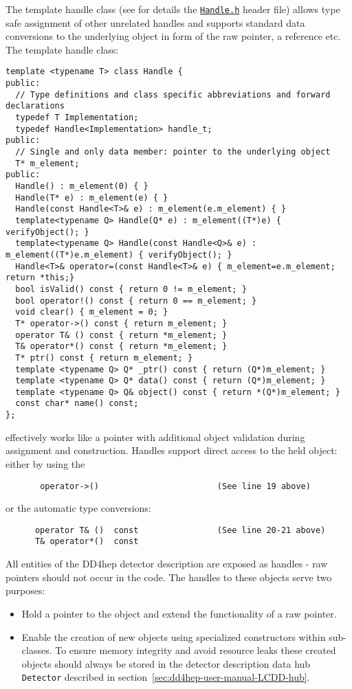 The template handle class (see for details the \href{https://dd4hep.web.cern.ch/dd4hep/reference/classdd4hep_1_1Handle.html}{\texttt{Handle.h}} header file) allows type safe assignment of other unrelated handles and supports standard data conversions to the underlying object in form of the raw pointer, a reference etc.
The template handle class:

\begin{verbatim}
template <typename T> class Handle {
public:
  // Type definitions and class specific abbreviations and forward declarations
  typedef T Implementation;
  typedef Handle<Implementation> handle_t;
public:
  // Single and only data member: pointer to the underlying object
  T* m_element;
public:
  Handle() : m_element(0) { }
  Handle(T* e) : m_element(e) { }
  Handle(const Handle<T>& e) : m_element(e.m_element) { }
  template<typename Q> Handle(Q* e) : m_element((T*)e) { verifyObject(); }
  template<typename Q> Handle(const Handle<Q>& e) : m_element((T*)e.m_element) { verifyObject(); }
  Handle<T>& operator=(const Handle<T>& e) { m_element=e.m_element; return *this;}
  bool isValid() const { return 0 != m_element; }
  bool operator!() const { return 0 == m_element; }
  void clear() { m_element = 0; }
  T* operator->() const { return m_element; }
  operator T& () const { return *m_element; }
  T& operator*() const { return *m_element; }
  T* ptr() const { return m_element; }
  template <typename Q> Q* _ptr() const { return (Q*)m_element; }
  template <typename Q> Q* data() const { return (Q*)m_element; }
  template <typename Q> Q& object() const { return *(Q*)m_element; }
  const char* name() const;
};
\end{verbatim}
effectively works like a pointer with additional object validation during assignment and construction. Handles support direct access to the held object: either by using the 
\begin{verbatim}
       operator->()                        (See line 19 above)
\end{verbatim}
or the automatic type conversions:
\begin{verbatim}
      operator T& ()  const                (See line 20-21 above)
      T& operator*()  const
\end{verbatim}

All entities of the DD4hep detector description are exposed as handles - raw pointers should not occur in the code. The handles to these objects serve two purposes:
\begin{itemize}
\item Hold a pointer to the object and extend the functionality of a raw pointer.
\item Enable the creation of new objects using specialized constructors within sub-classes. To ensure memory integrity and avoid resource  leaks these created objects should always be stored in the detector description data hub \texttt{Detector} described in section~\ref{sec:dd4hep-user-manual-LCDD-hub}.
\end{itemize}


